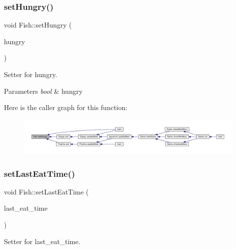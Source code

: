 \subsubsection{\texorpdfstring{set\+Hungry()}{setHungry()}}
{\footnotesize\ttfamily void Fish\+::set\+Hungry (\begin{DoxyParamCaption}\item[{bool}]{hungry }\end{DoxyParamCaption})}



Setter for hungry. 


\begin{DoxyParams}{Parameters}
{\em bool} & hungry \\
\hline
\end{DoxyParams}
Here is the caller graph for this function\+:
\nopagebreak
\begin{figure}[H]
\begin{center}
\leavevmode
\includegraphics[width=350pt]{class_fish_a8b24063bf538f0502cf38ce5859aec8e_icgraph}
\end{center}
\end{figure}
\mbox{\label{class_fish_ad53bd870836825ab0cc4b4d987325772}} 
\subsubsection{\texorpdfstring{set\+Last\+Eat\+Time()}{setLastEatTime()}}
{\footnotesize\ttfamily void Fish\+::set\+Last\+Eat\+Time (\begin{DoxyParamCaption}\item[{double}]{last\+\_\+eat\+\_\+time }\end{DoxyParamCaption})}



Setter for last\+\_\+eat\+\_\+time. 


